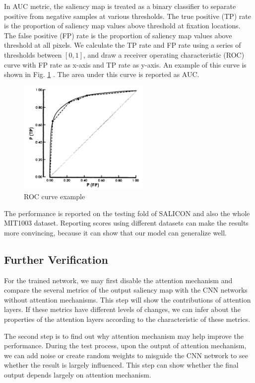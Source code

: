 \documentclass[12pt]{article}
\begin{document}
In AUC metric,
the saliency map is treated as a binary classifier to separate positive from negative samples at various thresholds. 
The true positive (TP) rate is the proportion of saliency map values above threshold at fixation locations. 
The false positive (FP) rate is the proportion of saliency map values above threshold at all pixels. 
We calculate the TP rate and FP rate using a series of thresholds between $[0, 1]$, and draw a
receiver operating characteristic (ROC) curve with FP rate as x-axis and TP rate as y-axis.
An example of this curve is shown in Fig. \ref{img:AUC} \cite{hanleyMeaningUseArea1982}.
The area under this curve is reported as AUC.
\begin{figure}[!h]
    \centering
    \includegraphics[width=2.5in]{imgs/AUC.png}
    \caption{ROC curve example}
    \label{img:AUC}
\end{figure}


The performance is reported on the testing fold of SALICON and also the whole MIT1003 dataset.
Reporting scores using different datasets can make the results more convincing,
because it can show that our model can generalize well.
\subsection{Further Verification}

For the trained network, we may first disable the attention mechanism and compare the several metrics of the output saliency map with the CNN networks without attention mechanisms.
This step will show the contributions of attention layers. If these metrics have different levels of changes, we can infer about the properties of the attention layers according to the characteristic of these metrics.

The second step is to find out why attention mechanism may help improve the performance. 
During the test process, upon the output of attention mechanism, we can add noise or create random weights to misguide the CNN network to see whether the result is largely influenced.
This step can show whether the final output depends largely on attention mechanism.
\end{document}

